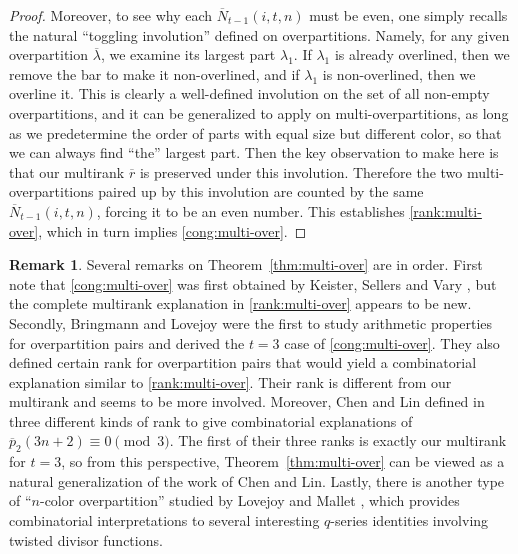 \documentclass[12pt]{amsart}
\numberwithin{equation}{section}
\theoremstyle{plain}
\theoremstyle{definition}
\newtheorem{remark}[theorem]{Remark}
\begin{document}
\begin{proof}
Moreover, to see why each $\overline{N}_{t-1}(i,t,n)$ must be even, one simply recalls the natural ``toggling involution'' defined on overpartitions. Namely, for any given overpartition $\overline{\lambda}$, we examine its largest part $\lambda_1$. If $\lambda_1$ is already overlined, then we remove the bar to make it non-overlined, and if $\lambda_1$ is non-overlined, then we overline it. This is clearly a well-defined involution on the set of all non-empty overpartitions, and it can be generalized to apply on multi-overpartitions, as long as we predetermine the order of parts with equal size but different color, so that we can always find ``the'' largest part. Then the key observation to make here is that our multirank $\overline{r}$ is preserved under this involution. Therefore the two multi-overpartitions paired up by this involution are counted by the same $\overline{N}_{t-1}(i,t,n)$, forcing it to be an even number. This establishes \eqref{rank:multi-over}, which in turn implies \eqref{cong:multi-over}.
\end{proof}
\begin{remark}
Several remarks on Theorem~\ref{thm:multi-over} are in order. First note that \eqref{cong:multi-over} was first obtained by Keister, Sellers and Vary \cite{KSV}, but the complete multirank explanation in \eqref{rank:multi-over} appears to be new. Secondly, Bringmann and Lovejoy \cite{BL} were the first to study arithmetic properties for overpartition pairs and derived the $t=3$ case of \eqref{cong:multi-over}. They also defined certain rank for overpartition pairs that would yield a combinatorial explanation similar to \eqref{rank:multi-over}. Their rank is different from our multirank and seems to be more involved. Moreover, Chen and Lin defined in \cite{CLi} three different kinds of rank to give combinatorial explanations of $\overline{p}_{2}(3n+2)\equiv0\pmod{3}$. The first of their three ranks is exactly our multirank for $t=3$, so from this perspective, Theorem~\ref{thm:multi-over} can be viewed as a natural generalization of the work of Chen and Lin. Lastly, there is another type of ``$n$-color overpartition'' studied by Lovejoy and Mallet \cite{LM}, which provides combinatorial interpretations to several interesting $q$-series identities involving twisted divisor functions.
\end{remark}
\end{document}
